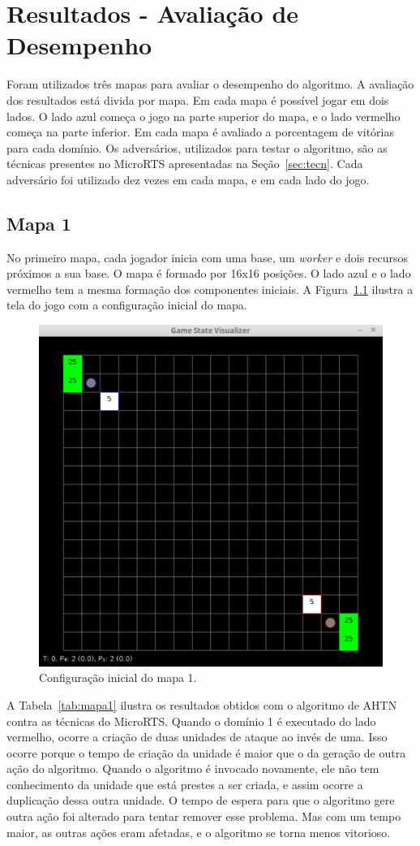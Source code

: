 
\chapter{\label{chap:results}Resultados - Avaliação de Desempenho}

Foram utilizados três mapas para avaliar o desempenho do algoritmo.
A avaliação dos resultados está divida por mapa.
Em cada mapa é possível jogar em dois lados.
O lado azul começa o jogo na parte superior do mapa, e o lado vermelho começa na parte inferior.
Em cada mapa é avaliado a porcentagem de vitórias para cada domínio.
Os adversários, utilizados para testar o algoritmo, são as técnicas presentes no MicroRTS apresentadas na Seção~\ref{sec:tecn}.
Cada adversário foi utilizado dez vezes em cada mapa, e em cada lado do jogo.

\section{Mapa 1}

No primeiro mapa, cada jogador inicia com uma base, um \textit{worker} e dois recursos próximos a sua base.
O mapa é formado por 16x16 posições.
O lado azul e o lado vermelho tem a mesma formação dos componentes iniciais.
A Figura~\ref{fig:mapa16x16} ilustra a tela do jogo com a configuração inicial do mapa.

\begin{figure}[ht]
	\centering
	\includegraphics[width=.5\textwidth]{fig/map16x16.pdf}
	\caption{Configuração inicial do mapa 1.}
	\label{fig:mapa16x16}
\end{figure}


A Tabela~\ref{tab:mapa1} ilustra os resultados obtidos com o algoritmo de AHTN contra as técnicas do MicroRTS.
Quando o domínio 1 é executado do lado vermelho, ocorre a criação de duas unidades de ataque ao invés de uma.
Isso ocorre porque o tempo de criação da unidade é maior que o da geração de outra ação do algoritmo.
Quando o algoritmo é invocado novamente, ele não tem conhecimento da unidade que está prestes a ser criada, e assim ocorre a duplicação dessa outra unidade.
O tempo de espera para que o algoritmo gere outra ação foi alterado para tentar remover esse problema.
Mas com um tempo maior, as outras ações eram afetadas, e o algoritmo se torna menos vitorioso.

